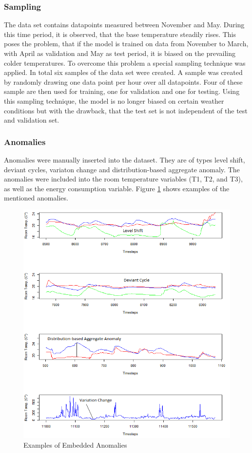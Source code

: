 \subsubsection{Sampling}
The data set contains datapoints measured between November and May. During this time period, it is observed, that the base temperature steadily rises. This poses the problem, that if the model is trained on data from November to March, with April as validation and May as test period, it is biased on the prevailing colder temperatures. To overcome this problem a special sampling technique was applied. In total six samples of the data set were created. A sample was created by randomly drawing one data point per hour over all datapoints. Four of these sample are then used for training, one for validation and one for testing. Using this sampling technique, the model is no longer biased on certain weather conditions but with the drawback, that the test set is not independent of the test and validation set.   

\subsubsection{Anomalies}
Anomalies were manually inserted into the dataset. They are of types level shift, deviant cycles, variaton change and distribution-based aggregate anomaly. The anomalies were included into the room temperature variables (T1, T2, and T3), as well as the energy consumption variable. Figure \ref{fig:temp_anomalies} shows examples of the mentioned anomalies.

\begin{figure}[h]
	\centering
	\includegraphics[scale=0.7]{Figures/temp_anomalies}
	\decoRule
	\caption[Temperature Dataset Anomalies]{Examples of Embedded Anomalies \parencite{Own}}
	\label{fig:temp_anomalies}
\end{figure}

